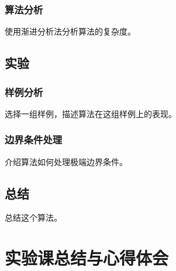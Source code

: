 \documentclass{ctexrep}
\begin{document}
\subsection{算法分析}
使用渐进分析法分析算法的复杂度。

\section{实验}
\subsection{样例分析}
选择一组样例，描述算法在这组样例上的表现。
\subsection{边界条件处理}
介绍算法如何处理极端边界条件。

\section{总结}
总结这个算法。

\chapter{实验课总结与心得体会}


\end{document}
